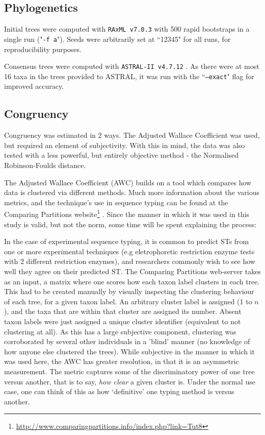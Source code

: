 \subsection{Phylogenetics}
Initial trees were computed with \texttt{RAxML v7.0.3} \citep{Stamatakis2006} with 500 rapid bootstraps in a single run ("\texttt{-f a}"). Seeds were arbitrarily set at ``12345" for all runs, for reproducibility purposes.

Consensus trees were computed with \texttt{ASTRAL-II v4.7.12} \citep{Mirarab2015}. As there were at most 16 taxa in the trees provided to ASTRAL, it was run with the ``\texttt{--exact}" flag for improved accuracy.

\subsection{Congruency}
Congruency was estimated in 2 ways. The Adjusted Wallace Coefficient was used, but required an element of subjectivity. With this in mind, the data was also tested with a less powerful, but entirely objective method - the Normalised Robinson-Foulds distance.

The Adjusted Wallace Coefficient (AWC) builds on a tool which compares how data is clustered via different methods. Much more information about the various metrics, and the technique's use in sequence typing can be found at the Comparing Partitions website\footnote{\url{http://www.comparingpartitions.info/index.php?link=Tut8}} \citep{Pinto2008, Severiano2011a, Severiano2011b, Carrico2006}. Since the manner in which it was used in this study is valid, but not the norm, some time will be spent explaining the process:

In the case of experimental sequence typing, it is common to predict STs from one or more experimental techniques (e.g eletrophoretic restriction enzyme tests with 2 different restriction enzymes), and researchers commonly wish to see how well they agree on their predicted ST. The Comparing Partitions web-server takes as an input, a matrix where one scores how each taxon label clusters in each tree. This had to be created manually by visually inspecting the clustering behaviour of each tree, for a given taxon label. An arbitrary cluster label is assigned (1 to $n$), and the taxa that are within that cluster are assigned its number. Absent taxon labels were just assigned a unique cluster identifier (equivalent to not clustering at all). As this has a large subjective component, clustering was corroborated by several other individuals in a 'blind' manner (no knowledge of how anyone else clustered the trees). While subjective in the manner in which it was used here, the AWC has greater resolution, in that it is an asymmetric measurement. The metric captures some of the discriminatory power of one tree versus another, that is to say, \emph{how clear} a given cluster is. Under the normal use case, one can think of this as how `definitive' one typing method is versus another.

